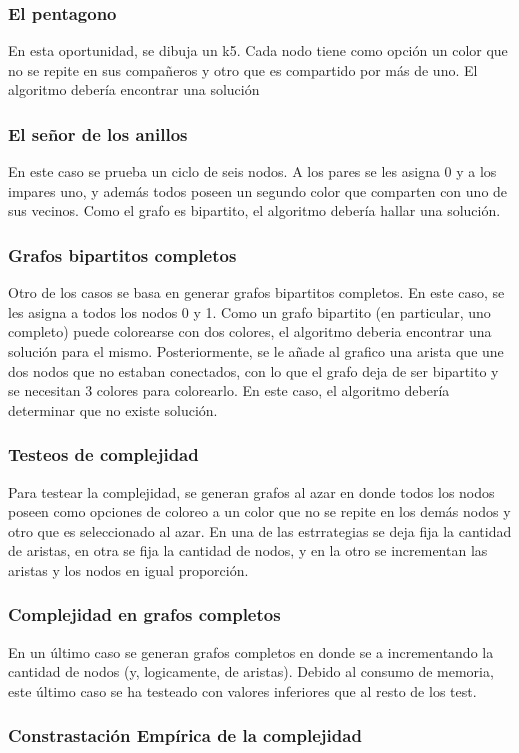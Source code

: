 \subsubsection{El pentagono}
En esta oportunidad, se dibuja un k5. Cada nodo tiene como opción un color que no se repite en sus compañeros y otro que es compartido por más de uno. El algoritmo debería encontrar una solución
\subsubsection{El señor de los anillos}
En este caso se prueba un ciclo de seis nodos. A los pares se les asigna 0 y a los impares uno, y además todos poseen un segundo color que comparten con uno de sus vecinos. Como el grafo es bipartito, el algoritmo debería hallar una solución.
\subsubsection{Grafos bipartitos completos}
Otro de los casos se basa en generar grafos bipartitos completos. En este caso, se les asigna a todos los nodos 0 y 1. Como un grafo bipartito (en particular, uno completo) puede colorearse con dos colores, el algoritmo deberia encontrar una solución para el mismo. Posteriormente, se le añade al grafico una arista que une dos nodos que no estaban conectados, con lo que el grafo deja de ser bipartito y se necesitan 3 colores para colorearlo. En este caso, el algoritmo debería determinar que no existe solución.

\subsubsection{Testeos de complejidad}
Para testear la complejidad, se generan grafos al azar en donde todos los nodos poseen como opciones de coloreo a un color que no se repite en los demás nodos y otro que es seleccionado al azar. En una de las estrrategias se deja fija la cantidad de aristas, en otra se fija la cantidad de nodos, y en la otro se incrementan las aristas y los nodos en igual proporción.

\subsubsection{Complejidad en grafos completos}
En un último caso se generan grafos completos en donde se a incrementando la cantidad de nodos (y, logicamente, de aristas). Debido al consumo de memoria, este último caso se ha testeado con valores inferiores que al resto de los test.

\subsubsection{Constrastación Empírica de la complejidad}


